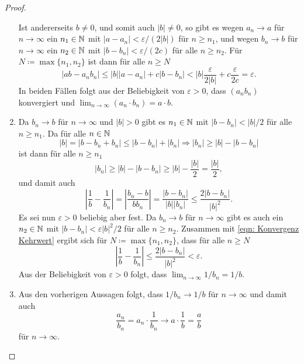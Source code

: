 \documentclass[a4paper,10pt]{article}
\begin{document}
\begin{proof}
\begin{enumerate}
\[   \]
   Ist andererseits $b \neq 0$, und somit auch $|b| \neq 0$, so gibt es wegen $a_n \to a$ für $n \to \infty$ ein $n_1 \in \mathbb{N}$ mit $|a - a_n| < \varepsilon/(2|b|)$ für $n \geq n_1$, und wegen $b_n \to b$ für $n \to \infty$ ein $n_2 \in \mathbb{N}$ mit $|b - b_n| < \varepsilon/(2c)$ für alle $n \geq n_2$. Für $N \coloneqq \max \{n_1, n_2\}$ ist dann für alle $n \geq N$
   \[
    |a b - a_n b_n|
    \leq |b| |a - a_n| + c |b - b_n|
    < |b| \frac{\varepsilon}{2|b|} + c \frac{\varepsilon}{2c}
    = \varepsilon.
   \]
   In beiden Fällen folgt aus der Beliebigkeit von $\varepsilon > 0$, dass $(a_n b_n)$ konvergiert und $\lim_{n \to \infty} (a_n \cdot b_n) = a \cdot b$.
  \item
   Da $b_n \to b$ für $n \to \infty$ und $|b| > 0$ gibt es $n_1 \in \mathbb{N}$ mit $|b - b_n| < |b|/2$ für alle $n \geq n_1$. Da für alle $n \in \mathbb{N}$
   \[
    |b| = |b - b_n + b_n| \leq |b - b_n| + |b_n| \Rightarrow |b_n| \geq |b| - |b - b_n|
   \]
   ist dann für alle $n \geq n_1$
   \[
    |b_n|
    \geq |b| - |b - b_n|
    \geq |b| - \frac{|b|}{2}
    = \frac{|b|}{2},
   \]
   und damit auch
   \begin{equation}\label{eqn: Konvergenz Kehrwert}
    \left| \frac{1}{b} - \frac{1}{b_n} \right|
    = \left| \frac{b_n - b}{b b_n} \right|
    = \frac{|b - b_n|}{|b| |b_n|}
    \leq \frac{2 |b - b_n|}{|b|^2}.
   \end{equation}
   Es sei nun $\varepsilon > 0$ beliebig aber fest. Da $b_n \to b$ für $n \to \infty$ gibt es auch ein $n_2 \in \mathbb{N}$ mit $|b - b_n| < \varepsilon|b|^2/2$ für alle $n \geq n_2$. Zusammen mit \eqref{eqn: Konvergenz Kehrwert} ergibt sich für $N \coloneqq \max \{n_1, n_2\}$, dass für alle $n \geq N$
   \[
    \left|\frac{1}{b} - \frac{1}{b_n}\right|
    \leq \frac{2 |b - b_n|}{|b|^2}
    < \varepsilon.
   \]
   Aus der Beliebigkeit von $\varepsilon > 0$ folgt, dass $\lim_{n \to \infty} 1/b_n = 1/b$.
  \item
   Aus den vorherigen Aussagen folgt, dass $1/b_n \to 1/b$ für $n \to \infty$ und damit auch
   \[
    \frac{a_n}{b_n} = a_n \cdot \frac{1}{b_n} \to a \cdot \frac{1}{b} = \frac{a}{b}
   \]
   für $n \to \infty$.
  \qedhere
 \end{enumerate}
\end{proof}
\end{document}
